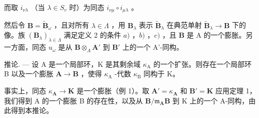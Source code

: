 而取 \(i_{\nu \lambda}\) （当 \(\lambda \in S_{v}\) 时）为同态 \(i_{\nu \mu} \circ i_{\mu \lambda}\) 。

然后令 \(\mathbf{B} = \tilde{\mathbf{B}}_{\omega}\) ，且对所有 \(\lambda \in \Lambda\) ，用 \(\mathbf{B}_{\lambda}\) 表示 \(\tilde{\mathbf{B}}_{\lambda}\) 在典范单射 \(\tilde{\mathbf{B}}_{\lambda} \to \mathbf{B}\) 下的像。族 \((\mathbf{B}_{\lambda})_{\lambda \in \Lambda}\) 满足定义 2 的条件 \(a)\) ，\(b)\) ，\(c)\) ，且 \(\mathbf{B}\) 是 A 的一个膨胀。另一方面，同态 \(u_{\omega}\) 是从 \(\mathbf{B} \otimes_{A} \mathbf{A}'\) 到 \(\mathbf{B}'\) 上的一个 A'-同构。

推论. --- 设 A 是一个局部环，K 是其剩余域 \(\kappa_{\mathrm{A}}\) 的一个扩张。则存在一个局部环 B 以及一个膨胀 \(\mathbf{A} \to \mathbf{B}\) ，使得 \(\kappa_{\mathrm{A}}\) -代数 \(\kappa_{\mathrm{B}}\) 同构于 K。

事实上，同态 \(\kappa_{\mathbf{A}} \to \mathbf{K}\) 是一个膨胀（例 1）。取 \(\mathbf{A}' = \kappa_{\mathbf{A}}\) 和 \(\mathbf{B}' = \mathbf{K}\) 应用定理 1，我们得到 A 的一个膨胀 B 的存在性，以及从 \(\mathbf{B} / \mathfrak{m}_{\mathbf{A}}\mathbf{B}\) 到 K 上的一个 A-同构，由此得到本推论。

